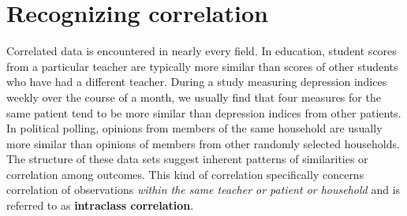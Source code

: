 \documentclass[
]{krantz}
\begin{document}
\begin{table}

\caption{\label{tab:simulationTableCh7}Summary of simulations for Dams and Pups case study}
\centering
{}
\end{table}

\hypertarget{recognizing-correlation}{%
\section{Recognizing correlation}\label{recognizing-correlation}}

Correlated data is encountered in nearly every field. In education, student scores from a particular teacher are typically more similar than scores of other students who have had a different teacher. During a study measuring depression indices weekly over the course of a month, we usually find that four measures for the same patient tend to be more similar than depression indices from other patients. In political polling, opinions from members of the same household are usually more similar than opinions of members from other randomly selected households. The structure of these data sets suggest inherent patterns of similarities or correlation among outcomes. This kind of correlation specifically concerns correlation of observations \emph{within the same teacher or patient or household} and is referred to as \textbf{intraclass correlation}.
\end{document}
